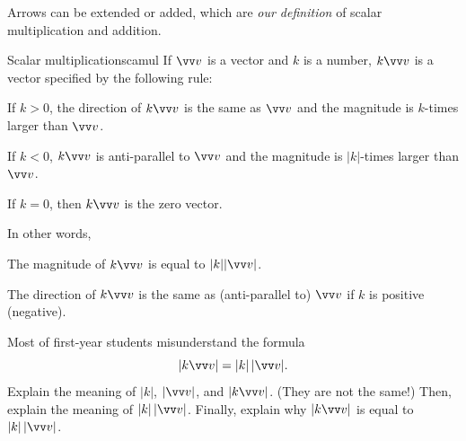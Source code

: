 \documentclass[11pt,pdfa,lastpage]{MishoNote}
\begin{document}
Arrows can be extended or added, which are \emph{our definition} of scalar multiplication and addition.
%
\begin{definition}{Scalar multiplication}{scamul}
If $\vc v$ is a vector and $k$ is a number, $k\vc v$ is a vector specified by the following rule:
\begin{miniitemize}
  \item If $k>0$, the direction of $k\vc v$ is the same as $\vc v$ and the magnitude is $k$-times larger than $\vc v$.
  \item If $k<0$, $k\vc v$ is anti-parallel to $\vc v$ and the magnitude is $|k|$-times larger than $\vc v$.
  \item If $k=0$, then $k\vc v$ is the zero vector.
\end{miniitemize}
In other words,
\begin{miniitemize}
  \item The magnitude of $k \vc v$ is equal to $|k||\vc v|$.
  \item The direction of $k \vc v$ is the same as (anti-parallel to) $\vc v$ if $k$ is positive (negative).
\end{miniitemize}
\end{definition}

\begin{quizzes}
  \Quiz[S] Most of first-year students misunderstand the formula
\begin{equation}
  |k\vc v|=|k|\,|\vc v|.
\end{equation}
  Explain the meaning of $|k|$, $|\vc v|$, and $|k\vc v|$. (They are not the same!) Then, explain the meaning of $|k|\,|\vc v|$. Finally, explain why $|k\vc v|$ is equal to $|k|\,|\vc v|$.

\end{quizzes}

\newpage
\end{document}
